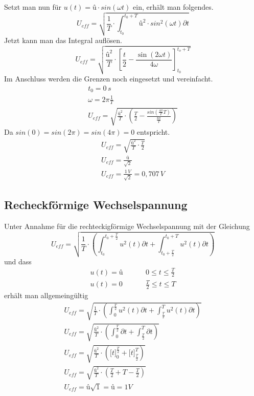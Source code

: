             Setzt man nun für $ u(t) = û\cdot sin(\omega t)$ ein, erhält man folgendes.
            \begin{equation}
                U_{eff}=\sqrt{\frac{1}{T}\cdot\int_{t_0}^{t_0+T} û^2\cdot sin^2(\omega t)\partial t}
            \end{equation}
Jetzt kann man das Integral auflösen.
\begin{equation}
    U_{eff}=\sqrt{\frac{û^2}{T}\cdot\left[\frac{t}{2} - \frac{\sin(2\omega t)}{4\omega}\right]_{t_0}^{t_o+T}}
    \label{ansatz}
\end{equation}
Im Anschluss werden die Grenzen noch eingesetzt und vereinfacht. 
\begin{gather}
    t_0 = 0\, s\\
    \omega = 2\pi\frac{1}{T}\\
    U_{eff}=\sqrt{\frac{û^2}{T}\cdot\left(\frac{T}{2}-\frac{sin\left(\frac{4\pi}{T} T\right)}{\frac{8\pi}{T}}\right)}
\end{gather}
Da $sin(0) = sin(2\pi) = sin(4\pi) = 0$ entspricht. 
\begin{gather}
    U_{eff}=\sqrt{\frac{û^2}{T}\cdot\frac{T}{2}}\\
    U_{eff}=\frac{û}{\sqrt{2}}\\
    U_{eff}=\frac{1\, V}{\sqrt{2}} = 0,707\, V
\end{gather}
        \subsection{Recheckförmige Wechselspannung}
            Unter Annahme für die rechteckigförmige Wechselspannung mit der Gleichung
            \begin{equation}\label{equ:rechteck}
                U_{eff}=\sqrt{\frac{1}{T}\cdot\left(\int_{t_0}^{t_0+\frac{T}{2}} u^2(t)\partial t + \int_{t_0+\frac{T}{2}}^{t_0+T} u^2(t)\partial t\right)}
            \end{equation} 
            und dass 
            \begin{align}
                u(t)=û  &\hspace{1cm}0 \leq t \leq \frac{T}{2}\\
                u(t)=0 &\hspace{1cm} \frac{T}{2} \leq t \leq T
            \end{align}    
            erhält man allgemeingültig 
            \begin{gather}
                U_{eff}=\sqrt{\frac{1}{T}\cdot\left(\int_{0}^{\frac{T}{2}} u^2(t)\partial t + \int_{\frac{T}{2}}^{T} u^2(t)\partial t\right)}    \\
                U_{eff}=\sqrt{\frac{û^2}{T}\cdot\left(\int_{0}^{\frac{T}{2}} \partial t + \int_{\frac{T}{2}}^{T}\partial t\right)}    \\
                U_{eff}=\sqrt{\frac{û^2}{T}\cdot\left(\big[t\big]_{0}^{\frac{T}{2}} + \big[t\big]_{\frac{T}{2}}^{T}\right)} \\  
                U_{eff}=\sqrt{\frac{û^2}{T}\cdot\left(\frac{T}{2}+T-\frac{T}{2}\right)} \\
                U_{eff}=û\sqrt{1} = û = 1V
            \end{gather}
